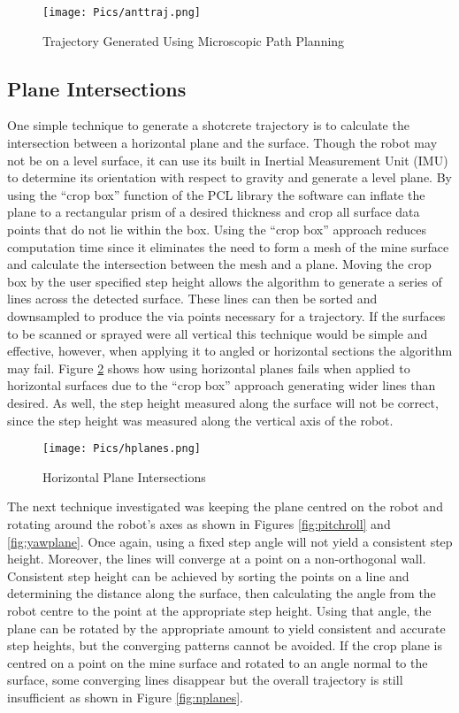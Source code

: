 \begin{figure}[h]
    \centering
    \texttt{[image: Pics/anttraj.png]}
    \caption{Trajectory Generated Using Microscopic Path Planning}
    \label{fig:anttraj}
\end{figure}

\subsection{Plane Intersections}

One simple technique to generate a shotcrete trajectory is to calculate the intersection between a horizontal plane and the surface. Though the robot may not be on a level surface, it can use its built in Inertial Measurement Unit (IMU) to determine its orientation with respect to gravity and generate a level plane. By using the ``crop box'' function of the PCL library the software can inflate the plane to a rectangular prism of a desired thickness and crop all surface data points that do not lie within the box. Using the ``crop box'' approach reduces computation time since it eliminates the need to form a mesh of the mine surface and calculate the intersection between the mesh and a plane. Moving the crop box by the user specified step height allows the algorithm to generate a series of lines across the detected surface. These lines can then be sorted and downsampled to produce the via points necessary for a trajectory. If the surfaces to be scanned or sprayed were all vertical this technique would be simple and effective, however, when applying it to angled or horizontal sections the algorithm may fail. Figure \ref{fig:hplanes} shows how using horizontal planes fails when applied to horizontal surfaces due to the ``crop box'' approach generating wider lines than desired. As well, the step height measured along the surface will not be correct, since the step height was measured along the vertical axis of the robot.\\

\begin{figure}[h]
    \centering
    \texttt{[image: Pics/hplanes.png]}
    \caption{Horizontal Plane Intersections}
    \label{fig:hplanes}
\end{figure}
The next technique investigated was keeping the plane centred on the robot and rotating around the robot's axes as shown in Figures \ref{fig:pitchroll} and \ref{fig:yawplane}. Once again, using a fixed step angle will not yield a consistent step height. Moreover, the lines will converge at a point on a non-orthogonal wall. Consistent step height can be achieved by sorting the points on a line and determining the distance along the surface, then calculating the angle from the robot centre to the point at the appropriate step height. Using that angle, the plane can be rotated by the appropriate amount to yield consistent and accurate step heights, but the converging patterns cannot be avoided. If the crop plane is centred on a point on the mine surface and rotated to an angle normal to the surface, some converging lines disappear but the overall trajectory is still insufficient as shown in Figure \ref{fig:nplanes}. \\

